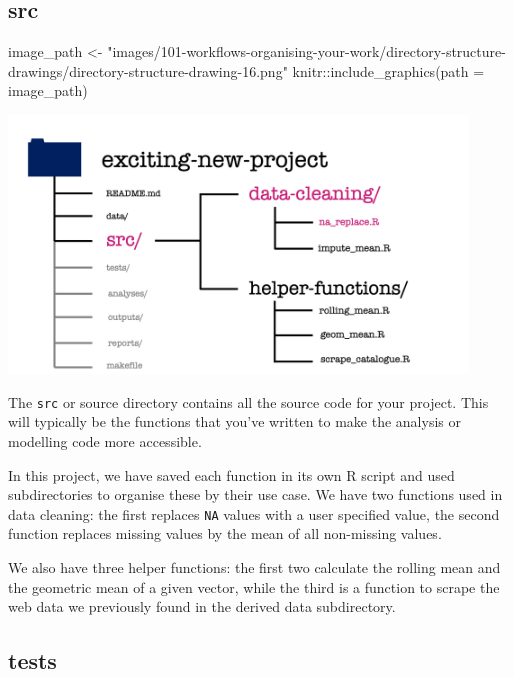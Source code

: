 \documentclass[
  letterpaper,
  DIV=11,
  numbers=noendperiod]{scrreprt}
\newenvironment{Shaded}{\begin{snugshade}}{\end{snugshade}}
\newcommand{\AttributeTok}[1]{\textcolor[rgb]{0.40,0.45,0.13}{#1}}
\newcommand{\FunctionTok}[1]{\textcolor[rgb]{0.28,0.35,0.67}{#1}}
\newcommand{\NormalTok}[1]{\textcolor[rgb]{0.00,0.23,0.31}{#1}}
\newcommand{\OtherTok}[1]{\textcolor[rgb]{0.00,0.23,0.31}{#1}}
\newcommand{\SpecialCharTok}[1]{\textcolor[rgb]{0.37,0.37,0.37}{#1}}
\newcommand{\StringTok}[1]{\textcolor[rgb]{0.13,0.47,0.30}{#1}}
\begin{document}
\subsection{src}\label{src}

\begin{Shaded}
\begin{Highlighting}[]
\NormalTok{image\_path }\OtherTok{\textless{}{-}} \StringTok{"images/101{-}workflows{-}organising{-}your{-}work/directory{-}structure{-}drawings/directory{-}structure{-}drawing{-}16.png"}
\NormalTok{knitr}\SpecialCharTok{::}\FunctionTok{include\_graphics}\NormalTok{(}\AttributeTok{path =}\NormalTok{ image\_path)}
\end{Highlighting}
\end{Shaded}

\includegraphics[width=4.8in,height=\textheight]{images/101-workflows-organising-your-work/directory-structure-drawings/directory-structure-drawing-16.png}

The \texttt{src} or source directory contains all the source code for
your project. This will typically be the functions that you've written
to make the analysis or modelling code more accessible.

In this project, we have saved each function in its own R script and
used subdirectories to organise these by their use case. We have two
functions used in data cleaning: the first replaces \texttt{NA} values
with a user specified value, the second function replaces missing values
by the mean of all non-missing values.

We also have three helper functions: the first two calculate the rolling
mean and the geometric mean of a given vector, while the third is a
function to scrape the web data we previously found in the derived data
subdirectory.

\subsection{tests}\label{tests}
\end{document}
